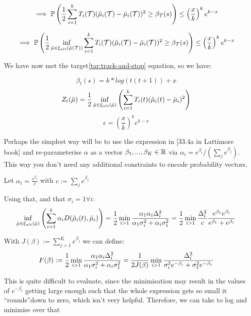 $$\implies \mathbb{P} \left(\frac{1}{2}\sum_{i=1}^{k} T_i(\mathcal{T})(\hat{\mu}_{i}(\mathcal{T}) - \bar{\mu}_{i}(\mathcal{T}))^2 \geq \beta_{\mathcal{T}}(s) \right) \leq \left(\frac{x}{k}\right)^k e^{k-x}$$

$$\implies \mathbb{P} \left(\frac{1}{2}\inf\limits_{\bar{\mu} \in \xi_{alt}(\hat{\mu}(\mathcal{T}))}\sum_{i=1}^{k} T_i(\mathcal{T})(\hat{\mu}_{i}(\mathcal{T}) - \bar{\mu}_{i}(\mathcal{T}))^2 \geq \beta_{\mathcal{T}}(s) \right) \leq \left(\frac{x}{k}\right)^k e^{k-x}$$

We have now met the target\ref{tar:track-and-stop} equation, so we have:

$$\beta_{t}(s) = k * log\left(t(t+1)\right) + x$$
$$Z_{t}(\hat{\mu}) = \frac{1}{2}\inf\limits_{\bar{\mu} \in \xi_{alt}(\hat{\mu})}\left(\sum_{i=1}^{k} T_i(t)(\hat{\mu}_{i}(t) - \bar{\mu}_{i})^2\right)$$
$$\epsilon = \left(\frac{x}{k}\right)^k e^{k-x}$$

Perhaps the simplest way will be to use the expression in [33.4a in Lattimore book] and re-parameterise $\alpha$ as a vector $\beta_1,...,\beta_K \in \mathbb{R} $ via $ \alpha_i = e^{\beta_i}/(\sum_j e^{\beta_j})$. This way you don't need any additional constraints to encode probability vectors.

Let $\alpha_i = \frac{e^{\beta_i}}{c}$ with $c := \sum_j e^{\beta_j}$

Using that, and that $\sigma_i = 1 \forall i$:
$$\inf\limits_{\bar{\mu} \in \xi_{alt}(\hat{\mu})}\left(\sum_{i=1}^{k} \alpha_i D(\hat{\mu}_{i}(t), \bar{\mu}_{i})\right) = \frac{1}{2}\min_{i>1}\frac{\alpha_1 \alpha_i \Delta_{i}^2}{\alpha_1 \sigma_i^2 + \alpha_i \sigma_1^2} = \frac{1}{2}\min_{i>1}\frac{\Delta_{i}^2}{c} \frac{e^{\beta_1} e^{\beta_i}}{e^{\beta_1} + e^{\beta_i}}
$$

With $J(\beta):=\sum_{j=1}^K e^{\beta_j}$ we can define:
\[F(\beta):= \frac{1}{2}\min_{i>1}\frac{\alpha_1 \alpha_i \Delta_{i}^2}{\alpha_1 \sigma_i^2 + \alpha_i \sigma_1^2}=\frac{1}{2J(\beta)}\min_{i>1}   \frac{\Delta_i^2}{\sigma_i^2e^{-\beta_i} +\sigma_1^2 e^{-\beta_1} }\]

This is quite difficult to evaluate, since the minimisation may result in the values of $e^{-\beta_i}$ getting large enough such that the whole expression gets so small it \textquotedblleft rounds\textquotedblright\space down to zero, which isn't very helpful. Therefore, we can take to log and minimise over that

